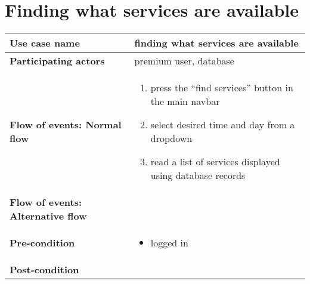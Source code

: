 \documentclass[a4paper, 13pt, draft]{report}
\begin{document}
\section*{Finding what services are available}

\begin{center}
	\begin{tabular}{| >{\bf}l | p{5.55cm} |} 
		\hline
		Use case name & finding what services are available \\ 
		\hline
		Participating actors & premium user, database \\
		\hline
		Flow of events: Normal flow & 
		\begin{enumerate}		
			\item press the ``find services'' button in the main navbar
			\item select desired time and day from a dropdown
			\item read a list of services displayed using database records
		\end{enumerate}	\\
		\hline
		Flow of events: Alternative flow & \notapplicable \\
		\hline
		Pre-condition & 
		\begin{itemize} 
			\item logged in
		\end{itemize} \\
		\hline
		Post-condition & \notapplicable \\
		\hline
	\end{tabular}
\end{center}
\end{document}
